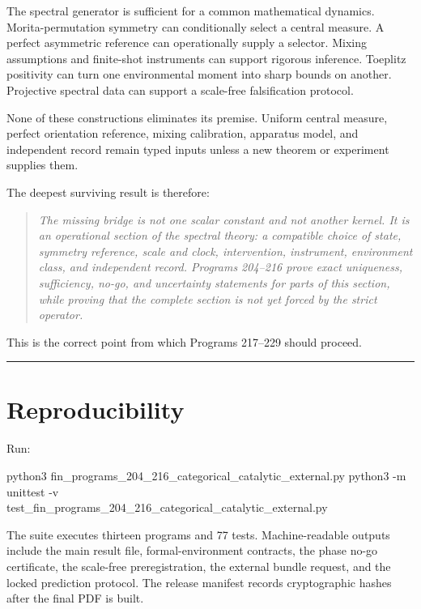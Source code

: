 \documentclass[11pt,a4paper,openany]{report}
\begin{document}
The spectral generator is sufficient for a common mathematical dynamics. Morita-permutation symmetry can conditionally select a central measure. A perfect asymmetric reference can operationally supply a selector. Mixing assumptions and finite-shot instruments can support rigorous inference. Toeplitz positivity can turn one environmental moment into sharp bounds on another. Projective spectral data can support a scale-free falsification protocol.

None of these constructions eliminates its premise. Uniform central measure, perfect orientation reference, mixing calibration, apparatus model, and independent record remain typed inputs unless a new theorem or experiment supplies them.

The deepest surviving result is therefore:

\begin{quote}\itshape
The missing bridge is not one scalar constant and not another kernel. It is an operational section of the spectral theory: a compatible choice of state, symmetry reference, scale and clock, intervention, instrument, environment class, and independent record. Programs 204--216 prove exact uniqueness, sufficiency, no-go, and uncertainty statements for parts of this section, while proving that the complete section is not yet forced by the strict operator.

\end{quote}

This is the correct point from which Programs 217--229 should proceed.

\par\medskip\hrule\medskip

\chapter{Reproducibility}

Run:

python3 fin\_programs\_204\_216\_categorical\_catalytic\_external.py python3 -m unittest -v \\
test\_fin\_programs\_204\_216\_categorical\_catalytic\_external.py

The suite executes thirteen programs and 77 tests. Machine-readable outputs include the main result file, formal-environment contracts, the phase no-go certificate, the scale-free preregistration, the external bundle request, and the locked prediction protocol. The release manifest records cryptographic hashes after the final PDF is built.
\end{document}
